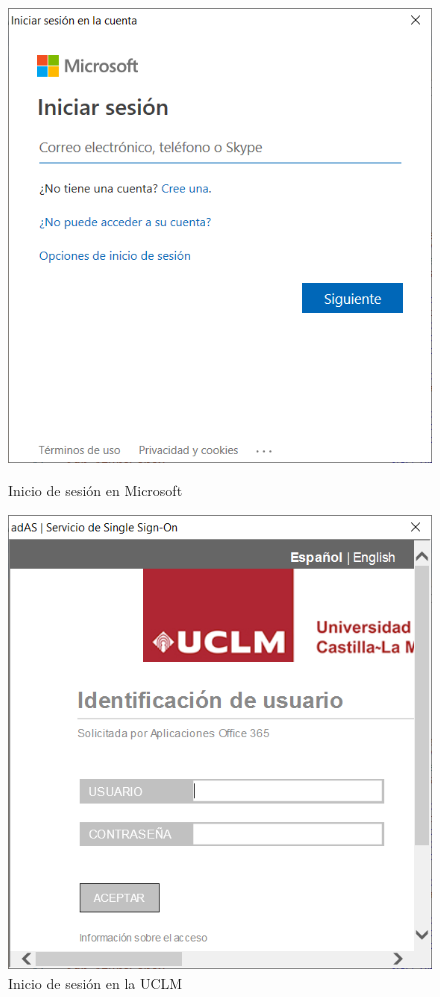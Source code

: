\clearpage

\begin{figure}
    \centering
    \begin{minipage}{.5\textwidth}
        \centering
        \includegraphics[width=0.8\linewidth]{figures/images/script/inicio_microsoft.PNG}
        \caption{Inicio de sesión en Microsoft}
        \label{fig:man_inicio_microsoft}
    \end{minipage}%
    \begin{minipage}{.5\textwidth}
        \centering
        \includegraphics[width=0.8\linewidth]{figures/images/script/inicio_uclm.PNG}
        \caption{Inicio de sesión en la \acs{UCLM}}
        \label{fig:man_inicio_uclm}
    \end{minipage}
\end{figure}

